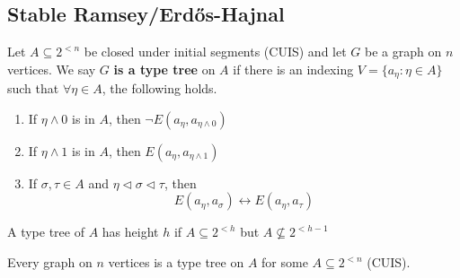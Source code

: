 \documentclass{article}
\begin{document}
\subsection{Stable Ramsey/Erd\H{o}s-Hajnal}
\begin{defi}
  Let $A \subseteq 2^{<n}$ be closed under initial segments (CUIS) and let $G$ be a graph on $n$ vertices.
  We say $G$ \textbf{is a type tree} on $A$ if there is an indexing $V = \{a_\eta : \eta \in A\}$ such that $\forall \eta \in A$, the following holds.
  \begin{enumerate}[label=(\arabic*)]
    \item If $\eta \wedge 0$ is in $A$, then $\neg E(a_\eta, a_{\eta \wedge 0})$
    \item If $\eta \wedge 1$ is in $A$, then $E(a_\eta, a_{\eta \wedge 1})$
    \item If $\sigma,\tau \in A$ and $\eta \lhd \sigma \lhd \tau$, then
      \begin{equation*}
        E(a_\eta, a_\sigma) \leftrightarrow E(a_\eta, a_\tau)
      \end{equation*}
  \end{enumerate}
  A type tree of $A$ has height $h$ if $A \subseteq 2^{<h}$ but $A \nsubseteq 2^{<h-1}$
\end{defi}
\begin{lemma}
  Every graph on $n$ vertices is a type tree on $A$ for some $A \subseteq 2^{<n}$ (CUIS).
\end{lemma}
\end{document}
